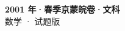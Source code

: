 \documentclass[zihao=-4, a4paper]{ctexart}
\begin{document}
\begin{center}
  {\Large\bfseries 2001 年·春季京蒙皖卷·文科}\\[4pt]
  {\large 数学 · 试题版}
\end{center}
\medskip
{}

\end{document}
